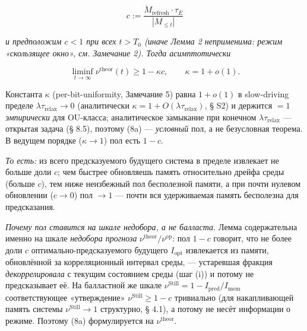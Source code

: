 \documentclass[pdflatex,sn-mathphys-ay]{sn-jnl}
\providecommand{\lt}{<}\providecommand{\gt}{>}
\begin{document}
\begin{equation}c := \frac{\dot{M}_{\text{refresh}} \cdot \tau_E}{|M_{\le t}|} \tag{*}\end{equation}



\emph{и предположим \(c \lt 1\) при всех \(t > T_0\) (иначе Лемма 2 неприменима: режим «скользящее окно», см. Замечание 2). Тогда асимптотически}



\begin{equation}\liminf_{t \to \infty} \nu^{\text{theor}}(t) \ge 1 - \kappa c, \qquad \kappa = 1 + o(1). \tag{8a}\end{equation}



Константа \(\kappa\) (per-bit-uniformity, Замечание 5) равна \(1 + o(1)\) в slow-driving пределе \(\lambda\tau_{\text{relax}} \to 0\) (аналитически \(\kappa = 1 + O(\lambda\tau_{\text{relax}})\), § S2) и держится \(=1\) \emph{эмпирически} для OU-класса; аналитическое замыкание при конечном \(\lambda\tau_{\text{relax}}\) --- открытая задача (§ 8.5), поэтому (8a) --- \emph{условный} пол, а не безусловная теорема. В ведущем порядке (\(\kappa \to 1\)) пол есть \(1-c\).



\emph{То есть:} из всего предсказуемого будущего система в пределе извлекает не больше доли \(c\); чем быстрее обновляешь память относительно дрейфа среды (больше \(c\)), тем ниже неизбежный пол бесполезной памяти, а при почти нулевом обновлении (\(c \to 0\)) пол \(\to 1\) --- почти вся удерживаемая память бесполезна для предсказания.



\emph{Почему пол ставится на шкале недобора, а не балласта.} Лемма содержательна именно на шкале \emph{недобора прогноза} \(\nu^{\text{theor}}/\nu^{\text{op}}\): пол \(1-c\) говорит, что не более доли \(c\) оптимально-предсказуемого будущего \(I_{\text{opt}}\) извлекается из памяти, обновлённой за корреляционный интервал среды, --- устаревшая фракция \emph{декоррелировала} с текущим состоянием среды (шаг (i)) и потому не предсказывает её. На балластной же шкале \(\nu^{\text{Still}} = 1 - I_{\text{pred}}/I_{\text{mem}}\) соответствующее «утверждение» \(\nu^{\text{Still}} \ge 1-c\) тривиально (для накапливающей память системы \(\nu^{\text{Still}} \to 1\) структурно, § 4.1), а потому не несёт информации о режиме. Поэтому (8a) формулируется на \(\nu^{\text{theor}}\).
\end{document}
